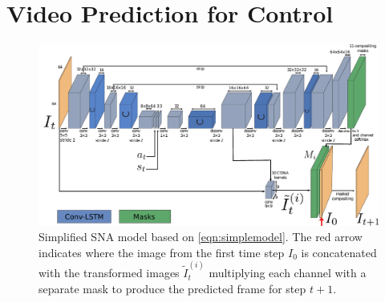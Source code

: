 \section{Video Prediction for Control}

\begin{figure}[t]
    \centering
    \includegraphics[width=\columnwidth]{images_sna/occlusionaware/occlusion_model.pdf}
    \caption{\small{Simplified SNA model based on \autoref{eqn:simplemodel}. The red arrow indicates where the image from the first time step $I_0$ is concatenated with the transformed images $\tilde{I}^{(i)}_t$ multiplying each channel with a separate mask to produce the predicted frame for step $t+1$.  }}      \label{fig:occlusion_model}
\end{figure}

